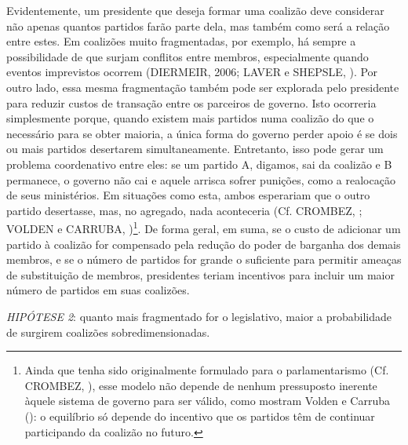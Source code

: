 Evidentemente, um presidente que deseja formar uma coalizão deve considerar não apenas quantos partidos farão parte dela, mas também como será a relação entre estes. Em coalizões muito fragmentadas, por exemplo, há sempre a possibilidade de que surjam conflitos entre membros, especialmente quando eventos imprevistos ocorrem (DIERMEIR, 2006; LAVER e SHEPSLE, \citeyear{laver1996}). Por outro lado, essa mesma fragmentação também pode ser explorada pelo presidente para reduzir custos de transação entre os parceiros de governo. Isto ocorreria simplesmente porque, quando existem mais partidos numa coalizão do que o necessário para se obter maioria, a única forma do governo perder apoio é se dois ou mais partidos desertarem simultaneamente. Entretanto, isso pode gerar um problema coordenativo entre eles: se um partido A, digamos, sai da coalizão e B permanece, o governo não cai e aquele arrisca sofrer punições, como a realocação de seus ministérios. Em situações como esta, ambos esperariam que o outro partido desertasse, mas, no agregado, nada aconteceria (Cf. CROMBEZ, \citeyear{crombez1996}; VOLDEN e CARRUBA, \citeyear{volden2004})\footnote{Ainda que tenha sido originalmente formulado para o parlamentarismo (Cf. CROMBEZ, \citeyear{crombez1996}), esse modelo não depende de nenhum pressuposto inerente àquele sistema de governo para ser válido, como mostram Volden e Carruba (\citeyear{volden2004}): o equilíbrio só depende do incentivo que os partidos têm de continuar participando da coalizão no futuro.}. De forma geral, em suma, se o custo de adicionar um partido à coalizão for compensado pela redução do poder de barganha dos demais membros, e se o número de partidos for grande o suficiente para permitir ameaças de substituição de membros, presidentes teriam incentivos para incluir um maior número de partidos em suas coalizões.

\vspace*{1\baselineskip}\vspace*{-\parskip}
\noindent
\textit{HIPÓTESE 2}: quanto mais fragmentado for o legislativo, maior a probabilidade de surgirem coalizões sobredimensionadas.
\vspace*{1\baselineskip}

